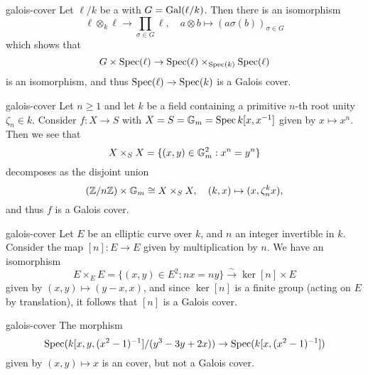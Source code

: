 \begin{example}{galois-cover}
    Let $\ell / k$ be a  with  $G = \textup{Gal}(\ell/k)$. Then there is an isomorphism
    \[ \ell \otimes_k \ell \to \prod_{\sigma \in G} \ell, \quad a \otimes b \mapsto (a \sigma(b))_{\sigma \in G} \]
    which shows that
    \[ G \times \operatorname{Spec}(\ell) \to \operatorname{Spec}(\ell) \times_{\operatorname{Spec}(k)} \operatorname{Spec}(\ell) \]
    is an isomorphism, and thus $\operatorname{Spec}(\ell) \to \operatorname{Spec}(k)$ is a Galois cover.
\end{example}

\begin{example}{galois-cover}
    Let $n \ge 1$ and let $k$ be a field containing a primitive $n$-th root unity $\zeta_n \in k$. Consider $f : X \to S$ with $X = S = \mathbb{G}_m = \operatorname{Spec} k[x, x^{-1}]$ given by $x \mapsto x^n$. Then we see that
    \[ X \times_S X = \{ (x, y) \in \mathbb{G}_m^2 : x^n = y^n \} \]
    decomposes as the disjoint union
    \[ (\mathbb{Z}/n\mathbb{Z}) \times \mathbb{G}_m \cong X \times_S X, \quad (k, x) \mapsto (x, \zeta_n^k x) , \]
    and thus $f$ is a Galois cover.
\end{example}

\begin{example}{galois-cover}
    Let $E$ be an elliptic curve over $k$, and $n$ an integer invertible in $k$. Consider the map $[n] : E \to E$ given by multiplication by $n$. We have an isomorphism
    \[ E \times_E E = \{ (x, y) \in E^2 : nx = ny \} \xrightarrow{\sim} \ker [n] \times E \]
    given by $(x, y) \mapsto (y - x, x)$, and since $\ker [n]$ is a finite group (acting on $E$ by translation), it follows that $[n]$ is a Galois cover.
\end{example}

\begin{example}{galois-cover}
    The morphism
    \[ \operatorname{Spec}(k[x, y, (x^2 - 1)^{-1}] / (y^3 - 3y + 2x)) \to \operatorname{Spec}(k[x, (x^2 - 1)^{-1}]) \]
    given by $(x, y) \mapsto x$ is an  cover, but not a Galois cover.
\end{example}

